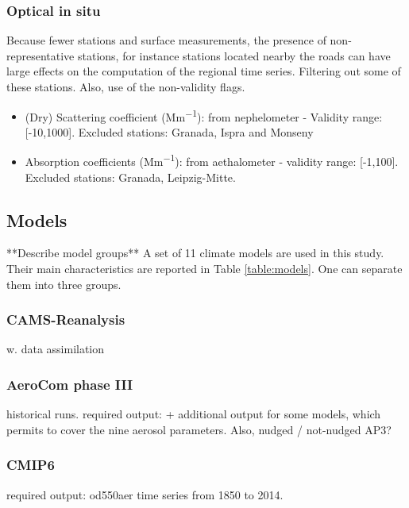 \documentclass[journal abbreviation, manuscript]{copernicus}
\begin{document}
\subsubsection{Optical in situ}
Because fewer stations and surface measurements, the presence of non-representative stations, for instance stations located nearby the roads can have large effects on the computation of the regional time series.  Filtering out some of these stations. Also, use of the non-validity flags.

\begin{itemize}
 \item (Dry) Scattering coefficient (\unit{Mm^{-1}}): from nephelometer - Validity range: [-10,1000]. Excluded stations: Granada, Ispra and Monseny
 \item Absorption coefficients (\unit{Mm^{-1}}): from aethalometer - validity range: [-1,100]. Excluded stations: Granada, Leipzig-Mitte.
\end{itemize}

\subsection{Models}
**Describe model groups**
A set of 11 climate models are used in this study. Their main characteristics are reported in Table \ref{table:models}.  One can separate them into three groups.


\subsubsection{CAMS-Reanalysis}
w. data assimilation

\subsubsection{AeroCom phase III}
historical runs.
required output: + additional output for some models, which permits to cover the nine aerosol parameters.
Also, nudged / not-nudged AP3?

\subsubsection{CMIP6}
required output: od550aer time series from 1850 to 2014.
\end{document}
